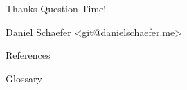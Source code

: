 \documentclass[
  10pt
]{beamer}
\begin{document}
\begin{frame}{Thanks}
  Question Time!

  Daniel Schaefer <git@danielschaefer.me>
\end{frame}


\begin{frame}{References}

\end{frame}

\begin{frame}{Glossary}
\end{frame}
\end{document}
